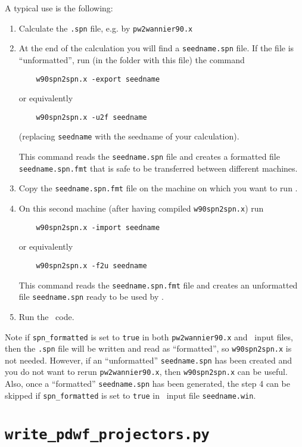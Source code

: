 A typical use is the following:
\begin{enumerate}
	\item Calculate the \verb|.spn| file, e.g. by \texttt{pw2wannier90.x}
	\item At the end of the calculation you will find a \verb|seedname.spn|
	file. If the file is ``unformatted'', run (in the folder with this file) the command
	\begin{verbatim}
	w90spn2spn.x -export seedname
	\end{verbatim}
	or equivalently
	\begin{verbatim}
	w90spn2spn.x -u2f seedname
	\end{verbatim}
	(replacing \verb|seedname| with the seedname of your calculation).
	
	This command reads the \verb|seedname.spn| file and creates a
	formatted file  \verb|seedname.spn.fmt| that is safe to be transferred
	between different machines.
	\item Copy the \verb|seedname.spn.fmt| file on the machine on
	which you want to run \postw.
	\item On this second machine (after having compiled
	\verb|w90spn2spn.x|) run
	\begin{verbatim}
	w90spn2spn.x -import seedname
	\end{verbatim}
	or equivalently
	\begin{verbatim}
	w90spn2spn.x -f2u seedname
	\end{verbatim}
	
	This command reads the \verb|seedname.spn.fmt| file and creates an
	unformatted file \verb|seedname.spn| ready to be used by \postw.
	
	\item Run the \postw\ code.
	
\end{enumerate}

Note if \texttt{spn\_formatted} is set to \texttt{true} in both 
\texttt{pw2wannier90.x} and \postw\ input files, then the \verb|.spn| file will 
be written and read as ``formatted'', so \texttt{w90spn2spn.x} is not needed. 
However, if an ``unformatted'' \verb|seedname.spn| has been created and 
you do not want to rerun \texttt{pw2wannier90.x}, then 
\texttt{w90spn2spn.x} can be useful. 
Also, once a ``formatted'' \verb|seedname.spn| has been generated, the step 4 can be skipped if 
\texttt{spn\_formatted} is set to \texttt{true} in \postw\ input file \verb|seedname.win|.

\section{{\tt write\_pdwf\_projectors.py}}

